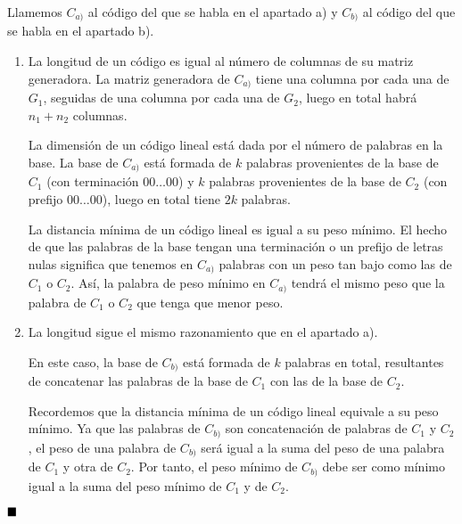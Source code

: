Llamemos $C_{a)}$ al código del que se habla en el apartado a) y $C_{b)}$ al código del que se habla en el apartado b).

\begin{enumerate}[label=\alph*)]
	\item La longitud de un código es igual al número de columnas de su matriz generadora. La matriz generadora de $C_{a)}$ tiene una columna por cada una de $G_1$, seguidas de una columna por cada una de $G_2$, luego en total habrá $n_1 + n_2$ columnas.
	
	La dimensión de un código lineal está dada por el número de palabras en la base. La base de $C_{a)}$ está formada de $k$ palabras provenientes de la base de $C_1$ (con terminación $00\hdots00$) y $k$ palabras provenientes de la base de $C_2$ (con prefijo $00\hdots00$), luego en total tiene $2k$ palabras.
	
	La distancia mínima de un código lineal es igual a su peso mínimo. El hecho de que las palabras de la base tengan una terminación o un prefijo de letras nulas significa que tenemos en $C_{a)}$ palabras con un peso tan bajo como las de $C_1$ o $C_2$. Así, la palabra de peso mínimo en $C_{a)}$ tendrá el mismo peso que la palabra de $C_1$ o $C_2$ que tenga que menor peso.
	
	\item La longitud sigue el mismo razonamiento que en el apartado a).
	
	En este caso, la base de $C_{b)}$ está formada de $k$ palabras en total, resultantes de concatenar las palabras de la base de $C_1$ con las de la base de $C_2$.
	
	Recordemos que la distancia mínima de un código lineal equivale a su peso mínimo. Ya que las palabras de $C_{b)}$ son concatenación de palabras de $C_1$ y $C_2$, el peso de una palabra de $C_{b)}$ será igual a la suma del peso de una palabra de $C_1$ y otra de $C_2$. Por tanto, el peso mínimo de $C_{b)}$ debe ser como mínimo igual a la suma del peso mínimo de $C_1$ y de $C_2$.
\end{enumerate}

$\qed$
